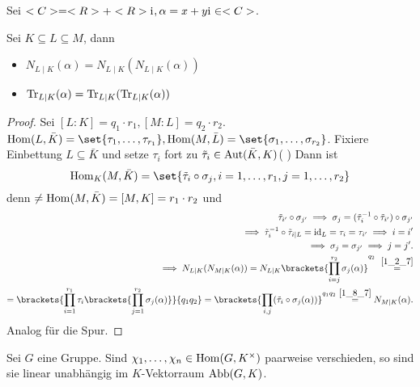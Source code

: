 \begin{example}
	Sei $<C> = <R> + <R>\mathrm{i}\mkern1mu, \alpha = x+y\mathrm{i}\mkern1mu \in <C>$.
\end{example}
\begin{conclusion}
	Sei $K \subseteq L \subseteq M$, dann
	\begin{itemize}
		\item $N_{L \mid K}(\alpha) = N_{L\mid K}(N_{L\mid K}(\alpha))$
		\item $\operatorname{Tr}_{L \mid K}(\alpha) = \operatorname{Tr}_{L \mid K}(\operatorname{Tr}_{L \mid K}(\alpha))$
	\end{itemize}
\end{conclusion}
\begin{proof}
	Sei $[L:K] = q_1 \cdot r_1, [M:L] = q_2 \cdot r_2$. $\Hom(L, \bar{K}) = \set{\tau_1, \dots, \tau_{r_1}}, \Hom(M, \bar{L}) = \set{\sigma_1, \dots, \sigma_{r_2}}$. Fixiere Einbettung $L \subseteq \bar{K}$ und setze $\tau_i$ fort zu $\tilde{\tau}_i \in \operatorname{Aut}(\bar{K}, K)$( ) %
	Dann ist
	\[
		\Hom_K(M, \bar{K}) = \set{\tilde{\tau}_i \circ \sigma_j, i =1, \dots, r_1, j = 1, \dots, r_2}
	\]
	denn $\neq \operatorname{Hom}(M, \bar{K}) = [M, K] = r_1 \cdot r_2$ und
	\begin{align*} %
		\tilde{\tau}_{i'} \circ \sigma_{j'} \implies \sigma_j = (\tilde{\tau}_i^{-1} \circ \tilde{\tau}_{i'})\circ \sigma_{j'}\\
		\implies \tilde{\tau}_i^{-1} \circ \tilde{\tau}_{i\mid L} = \id_L = \tau_i = \tau_{i'} \implies i = i'\\
		\implies \sigma_j = \sigma_{j'} \implies j = j'.\\
		\implies N_{L\mid K}(N_{M\mid K}(\alpha)) = N_{L\mid K}\brackets{\prod_{i=j}^{r_2} \sigma_j (\alpha)}^{q_2}\ \overset{\cref*{1_2_7}}{=}\\
		= \brackets{ \prod_{i=1}^{r_1} \tau_i \brackets{\prod_{j=1}^{r_2} \sigma_j (\alpha) }}{q_1 q_2} = \brackets{\prod_{i,j} (\tilde{\tau}_i \circ \sigma_j (\alpha))}^{q_1 q_2} \overset{\cref{1_8_7}}{=} N_{M \mid K}(\alpha).
	\end{align*}
	Analog für die Spur.
\end{proof}
\begin{theorem}
	Sei $G$ eine Gruppe. Sind $\chi_1, \dots, \chi_n \in \operatorname{Hom}(G, K^{\times})$ paarweise verschieden, so sind sie linear unabhängig im $K$-Vektorraum $\operatorname{Abb}(G,K)$.
\end{theorem}
